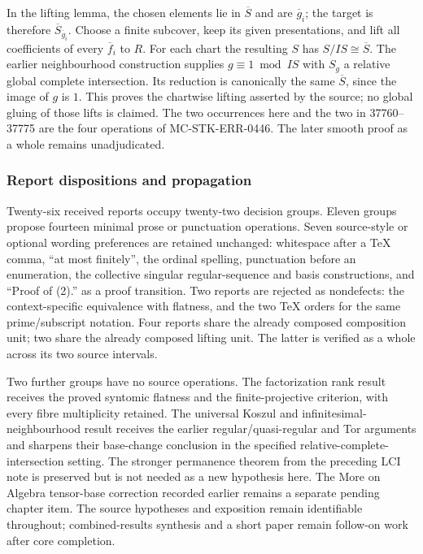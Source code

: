 In the lifting lemma, the chosen elements lie in \(\overline S\) and are \(\overline g_i\); the target is therefore \(\overline S_{\overline g_i}\). Choose a finite subcover, keep its given presentations, and lift all coefficients of every \(\overline f_i\) to \(R\). For each chart the resulting \(S\) has \(S/IS\cong\overline S\). The earlier neighbourhood construction supplies \(g\equiv1\bmod IS\) with \(S_g\) a relative global complete intersection. Its reduction is canonically the same \(\overline S\), since the image of \(g\) is \(1\). This proves the chartwise lifting asserted by the source; no global gluing of those lifts is claimed. The two occurrences here and the two in 37760--37775 are the four operations of MC-STK-ERR-0446. The later smooth proof as a whole remains unadjudicated.

\subsubsection{Report dispositions and propagation}\label{report-dispositions-and-propagation}

Twenty-six received reports occupy twenty-two decision groups. Eleven groups propose fourteen minimal prose or punctuation operations. Seven source-style or optional wording preferences are retained unchanged: whitespace after a TeX comma, ``at most finitely'', the ordinal spelling, punctuation before an enumeration, the collective singular regular-sequence and basis constructions, and ``Proof of (2).'' as a proof transition. Two reports are rejected as nondefects: the context-specific equivalence with flatness, and the two TeX orders for the same prime/subscript notation. Four reports share the already composed composition unit; two share the already composed lifting unit. The latter is verified as a whole across its two source intervals.

Two further groups have no source operations. The factorization rank result receives the proved syntomic flatness and the finite-projective criterion, with every fibre multiplicity retained. The universal Koszul and infinitesimal-neighbourhood result receives the earlier regular/quasi-regular and Tor arguments and sharpens their base-change conclusion in the specified relative-complete-intersection setting. The stronger permanence theorem from the preceding LCI note is preserved but is not needed as a new hypothesis here. The More on Algebra tensor-base correction recorded earlier remains a separate pending chapter item. The source hypotheses and exposition remain identifiable throughout; combined-results synthesis and a short paper remain follow-on work after core completion.
